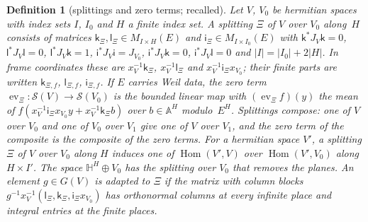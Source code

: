 \documentclass[11pt,a4paper]{article}
\newcommand{\Hom}{\operatorname{Hom}}
\newcommand{\kw}[1]{\emph{#1}}
\newcommand{\m}[1]{\mbox{$#1$}}        %
\theoremstyle{plainx}
\theoremstyle{uprightx}
\newtheorem{definition}[theorem]{Definition}
\newcommand{\A}{\mathbb{A}}
\newcommand{\Sch}[1]{\mathcal{S}(#1)}           %
\newcommand{\Hm}[2]{\Hom(#1,#2)}
\newcommand{\Hyp}[2]{\mathbb{H}^{#1}\oplus #2}  %
\newcommand{\ev}[1]{\operatorname{ev}_{#1}}     %
\newcommand{\Gg}[1]{G(#1)}
\begin{document}
\begin{definition}[splittings and zero terms; recalled]\label{d:split}
Let $V$, $V_0$ be hermitian spaces with index sets $I$, $I_0$ and $H$ a finite index set. A \kw{splitting} $\Xi$ of
$V$ over $V_0$ along~$H$ consists of matrices $\mathsf{k}_\Xi,\mathsf{l}_\Xi\in M_{I\times H}(E)$ and
\m{\mathsf{i}_\Xi\in M_{I\times I_0}(E)} with
\m{\mathsf{k}^{*}J_V\mathsf{k}=0}, \m{\mathsf{l}^{*}J_V\mathsf{l}=0}, \m{\mathsf{l}^{*}J_V\mathsf{k}=1},
\m{\mathsf{i}^{*}J_V\mathsf{i}=J_{V_0}}, \m{\mathsf{i}^{*}J_V\mathsf{k}=0}, \m{\mathsf{i}^{*}J_V\mathsf{l}=0} and
\m{|I|=|I_0|+2|H|}. In frame coordinates these are \m{x_V^{-1}\mathsf{k}_\Xi}, \m{x_V^{-1}\mathsf{l}_\Xi} and
\m{x_V^{-1}\mathsf{i}_\Xi x_{V_0}}; their finite parts are written \m{\mathsf{k}_{\Xi,f}}, \m{\mathsf{l}_{\Xi,f}},
\m{\mathsf{i}_{\Xi,f}}. If $E$ carries Weil data, the \kw{zero term} \m{\ev{\Xi}\colon\Sch{V}\to\Sch{V_0}} is the
bounded linear map with \m{(\ev{\Xi}f)(y)} the mean of $f(x_V^{-1}\mathsf{i}_\Xi x_{V_0}y+x_V^{-1}\mathsf{k}_\Xi b)$
over \m{b\in\A^{H}} modulo~$E^{H}$. Splittings compose: one of $V$ over $V_0$ and one of $V_0$ over $V_1$ give
one of $V$ over $V_1$, and the zero term of the composite is the composite of the zero terms. For a hermitian
space $V'$, a splitting $\Xi$ of $V$ over $V_0$ along $H$ induces one of \m{\Hm{V'}{V}} over \m{\Hm{V'}{V_0}} along
\m{H\times I'}. The space \m{\Hyp{H}{V_0}} has the splitting over $V_0$ that \kw{removes the planes}. An element
\m{g\in\Gg{V}} is \kw{adapted} to $\Xi$ if the matrix with column blocks
$g^{-1}x_V^{-1}(\mathsf{l}_\Xi,\mathsf{k}_\Xi,\mathsf{i}_\Xi x_{V_0})$ has orthonormal columns at every infinite place
and integral entries at the finite places.
\end{definition}
\end{document}
